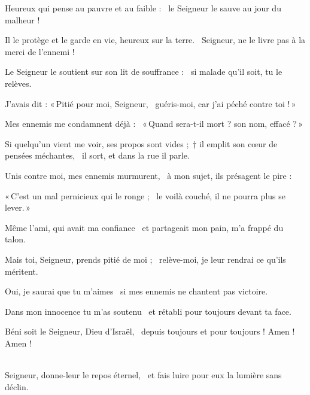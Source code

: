 \item Heureux qui pense au pauvre et au faible :~\psstar{} le Seigneur le sauve au jour du malheur !

\item Il le protège et le garde en vie, heureux sur la terre.~\psstar{} Seigneur, ne le livre pas à la merci de l'ennemi !

\item Le Seigneur le soutient sur son lit de souffrance :~\psstar{} si malade qu'il soit, tu le relèves.

\item J'avais dit : «\,Pitié pour moi, Seigneur,~\psstar{} guéris-moi, car j'ai péché contre toi !\,»

\item Mes ennemis me condamnent déjà :~\psstar{} «\,Quand sera-t-il mort ? son nom, effacé ?\,»

\item Si quelqu'un vient me voir, ses propos sont vides ;~† il emplit son cœur de pensées méchantes,~\psstar{} il sort, et dans la rue il parle.

\item Unis contre moi, mes ennemis murmurent,~\psstar{} à mon sujet, ils présagent le pire :

\item «\,C'est un mal pernicieux qui le ronge ;~\psstar{} le voilà couché, il ne pourra plus se lever.\,»

\item Même l'ami, qui avait ma confiance~\psstar{} et partageait mon pain, m'a frappé du talon.

\item Mais toi, Seigneur, prends pitié de moi ;~\psstar{} relève-moi, je leur rendrai ce qu'ils méritent.

\item Oui, je saurai que tu m'aimes~\psstar{} si mes ennemis ne chantent pas victoire.

\item Dans mon innocence tu m'as soutenu~\psstar{} et rétabli pour toujours devant ta face.

\item Béni soit le Seigneur, Dieu d'Israël,~\psstar{} depuis toujours et pour toujours ! Amen ! Amen !

\item ~\\Seigneur, donne-leur le repos éternel,~\psstar{} et fais luire pour eux la lumière sans déclin.